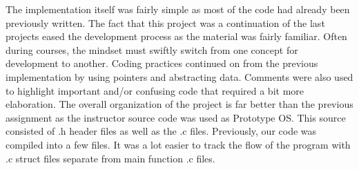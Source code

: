 \documentclass[11pt]{article} %
\newcommand{\tab}{\hspace*{2em}}
\begin{document}
\tab The implementation itself was fairly simple as most of the code had already been previously written.  The fact that this project was a continuation of the last projects eased the development process as the material was fairly familiar.  Often during courses, the mindset must swiftly switch from one concept for development to another.  Coding practices continued on from the previous implementation by using pointers and abstracting data.  Comments were also used to highlight important and/or confusing code that required a bit more elaboration.  The overall organization of the project is far better than the previous assignment as the instructor source code was used as Prototype OS.  This source consisted of .h header files as well as the .c files.  Previously, our code was compiled into a few files.  It was a lot easier to track the flow of the program with .c struct files separate from main function .c files.\\ 
\end{document}
